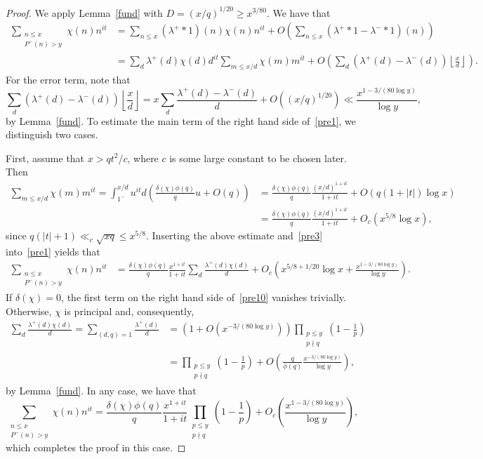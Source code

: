 \documentclass[12pt]{amsart}
\theoremstyle{remark}
\newcommand{\bsp}{\begin{split}}
\newcommand{\be}{\begin{equation}}
\newcommand{\ee}{\end{equation}}
\newcommand{\bes}{\begin{equation*}}
\newcommand{\ees}{\end{equation*}}
\numberwithin{equation}{section}
\begin{document}
\begin{proof} We apply Lemma~\ref{fund} with $D=(x/q)^{1/20}\ge x^{3/80}$. We have that
\be\label{pre1}\bsp
\sum_{\substack{n\le x\\P^-(n)>y}}\chi(n)n^{it}&=\sum_{n\le x}(\lambda^+*1)(n)\chi(n)n^{it}+O\left(\sum_{n\le x}(\lambda^+*1-\lambda^-*1)(n)\right)\\
&=\sum_d\lambda^+(d)\chi(d)d^{it}\sum_{m\le x/d}\chi(m)m^{it}+O\left(\sum_d(\lambda^+(d)-\lambda^-(d))\left\lfloor\frac xd\right\rfloor\right).
\end{split}\ee
For the error term, note that \be\label{pre3}\sum_d(\lambda^+(d)-\lambda^-(d))\left\lfloor\frac xd\right\rfloor=x\sum_d\frac{\lambda^+(d)-\lambda^-(d)}d+O\left((x/q)^{1/20}\right)\ll\frac{x^{1-3/(80\log y)}}{\log y},\ee by Lemma~\ref{fund}. To estimate the main term of the right hand side of~\eqref{pre1}, we distinguish two cases.

First, assume that $x>qt^2/c$, where $c$ is some large constant to be chosen later. Then
\bes\label{pre2}\bsp
\sum_{m\le x/d}\chi(m)m^{it} =\int_{1^-}^{x/d}u^{it}d\left(\frac{\delta(\chi)\phi(q)}qu+O(q)\right) &=\frac{\delta(\chi)\phi(q)}q\frac{(x/d)^{1+it}}{1+it}+O(q(1+|t|)\log x)\\
&=\frac{\delta(\chi)\phi(q)}q\frac{(x/d)^{1+it}}{1+it}+O_c(x^{5/8}\log x),
\end{split}\ees
since $q(|t|+1)\ll_c\sqrt{xq}\le x^{5/8}$. Inserting the above estimate and~\eqref{pre3} into~\eqref{pre1} yields that
\be\label{pre10}\bsp
\sum_{\substack{n\le x\\P^-(n)>y}}\chi(n)n^{it} &= \frac{\delta(\chi)\phi(q)}{q} \frac{x^{1+it}}{1+it} \sum_d\frac{\lambda^+(d)\chi(d)}{d}
+  O_c\left( x^{5/8+1/20}\log x+ \frac{ x^{1-3/(80\log y)} } {\log y} \right) .
\end{split}\ee
If $\delta(\chi)=0$, the first term on the right hand side of~\eqref{pre10} vanishes trivially. Otherwise, $\chi$ is principal and, consequently,
\bes\bsp
\sum_d\frac{\lambda^+(d)\chi(d)}{d} = \sum_{(d,q)=1}\frac{\lambda^+(d)}d
&= \left(1+O\left(x^{-3/(80\log y)}\right)\right) \prod_{\substack{p\le y\\p\nmid q}}\left(1-\frac1p\right) \\
& = \prod_{ \substack{p\le y\\p\nmid q} }\left(1-\frac1p\right)+O\left( \frac{q}{\phi(q)} \frac{x^{-3/(80\log y)} } {\log y} \right),
\end{split}\ees
by Lemma~\ref{fund}. In any case, we have that
\bes
\sum_{\substack{n\le x\\P^-(n)>y}}\chi(n)n^{it} = \frac{\delta(\chi)\phi(q)}{q} \frac{x^{1+it}}{1+it} \prod_{ \substack{p\le y\\p\nmid q} }\left(1-\frac1p\right)
+  O_c\left(\frac{ x^{1-3/(80\log y)} } {\log y} \right),
\ees
which completes the proof in this case.


\end{proof}
\end{document}
